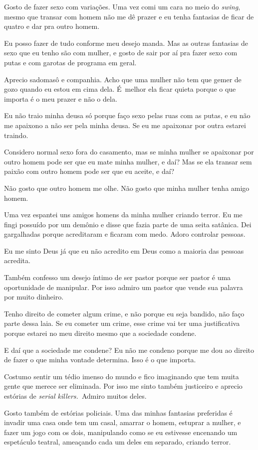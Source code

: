 Gosto de fazer sexo com variações. Uma vez comi um cara no meio do
\emph{swing}, mesmo que transar com homem não me dê prazer e eu tenha
fantasias de ficar de quatro e dar pra outro homem.

Eu posso fazer de tudo conforme meu desejo manda. Mas as outras
fantasias de sexo que eu tenho são com mulher, e gosto de sair por aí
pra fazer sexo com putas e com garotas de programa em geral.

Aprecio sadomasô e companhia. Acho que uma mulher não tem que gemer de
gozo quando eu estou em cima dela. É~melhor ela ficar quieta porque o
que importa é o meu prazer e não o dela.

Eu não traio minha deusa só porque faço sexo pelas ruas com as putas, e
eu não me apaixono a não ser pela minha deusa. Se eu me apaixonar por
outra estarei traindo.

Considero normal sexo fora do casamento, mas se minha mulher se
apaixonar por outro homem pode ser que eu mate minha mulher, e daí? Mas
se ela transar sem paixão com outro homem pode ser que eu aceite, e daí?

Não gosto que outro homem me olhe. Não gosto que minha mulher tenha
amigo homem.

Uma vez espantei uns amigos homens da minha mulher criando terror. Eu me
fingi possuído por um demônio e disse que fazia parte de uma seita
satânica. Dei gargalhadas porque acreditaram e ficaram com medo. Adoro
controlar pessoas.

Eu me sinto Deus já que eu não acredito em Deus como a maioria das
pessoas acredita.

Também confesso um desejo íntimo de ser pastor porque ser pastor é uma
oportunidade de manipular. Por isso admiro um pastor que vende sua
palavra por muito dinheiro.

Tenho direito de cometer algum crime, e não porque eu seja bandido, não
faço parte dessa laia. Se eu cometer um crime, esse crime vai ter uma
justificativa porque estarei no meu direito mesmo que a sociedade
condene.

E daí que a sociedade me condene? Eu não me condeno porque me dou ao
direito de fazer o que minha vontade determina. Isso é o que importa.

Costumo sentir um tédio imenso do mundo e fico imaginando que tem muita
gente que merece ser eliminada. Por isso me sinto também justiceiro e
aprecio estórias de \emph{serial killers.}~Admiro muitos deles.

Gosto também de estórias policiais. Uma das minhas fantasias preferidas
é invadir uma casa onde tem um casal, amarrar o homem, estuprar a
mulher, e fazer um jogo com os dois, manipulando como se eu estivesse
encenando um espetáculo teatral, ameaçando cada um deles em separado,
criando terror.

